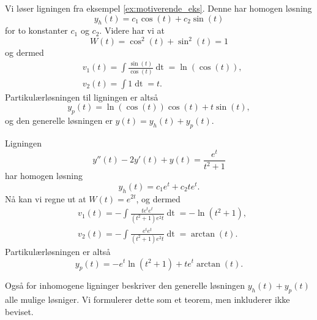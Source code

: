\documentclass{article}
\theoremstyle{definition}
\newenvironment{ex}
{\pushQED{\qed}\renewcommand{\qedsymbol}{$\triangle$}\exx}
{\popQED\endexx}
\theoremstyle{remark}
\begin{document}
\begin{multicols*}{2}
\begin{ex}
  Vi løser ligningen fra eksempel \ref{ex:motiverende_eks}. Denne har homogen løsning
  \begin{equation*}
    y_h(t) = c_1 \cos(t) + c_2 \sin(t)
  \end{equation*}
  for to konstanter $c_1$ og $c_2$. Videre har vi at
  \begin{equation*}
    W(t) = \cos^2(t) + \sin^2(t) = 1
  \end{equation*}
  og dermed
  \begin{equation*}
    \begin{split}
      & v_1(t) = \int \frac{\sin(t)}{\cos(t)} \mathop{dt} = \ln(\cos(t)), \\
      & v_2(t) = \int 1 \mathop{dt} = t.
    \end{split}
  \end{equation*}
  Partikulærløsningen til ligningen er altså
  \begin{equation*}
    y_p(t) = \ln(\cos(t)) \cos(t) + t \sin(t),
  \end{equation*}
  og den generelle løsningen er $y(t) = y_h(t) + y_p(t)$.
\end{ex}

\begin{ex}
  Ligningen
  \begin{equation*}
    y''(t) - 2y'(t) + y(t) = \frac{e^t}{t^2 + 1}
  \end{equation*}
  har homogen løsning
  \begin{equation*}
    y_h(t) = c_1 e^t + c_2 t e^{t}.
  \end{equation*}
  Nå kan vi regne ut at $W(t) = e^{2t}$, og dermed
  \begin{equation*}
    \begin{split}
      & v_1(t) = - \int \frac{t e^t e^t}{(t^2 + 1) e^2t} \mathop{dt} = - \ln(t^2 + 1), \\
      & v_2(t) = - \int \frac{e^t e^t}{(t^2 + 1) e^2t} \mathop{dt} = \arctan(t).
    \end{split}
  \end{equation*}
  Partikulærløsningen er altså
  \begin{equation*}
    y_p(t) = - e^t \ln(t^2 + 1) + t e^t \arctan(t).
  \end{equation*}
\end{ex}

Også for inhomogene ligninger beskriver den generelle løsningen $y_h(t) + y_p(t)$ alle mulige løsniger. Vi formulerer dette som et teorem, men inkluderer ikke beviset.


\end{multicols*}
\end{document}
